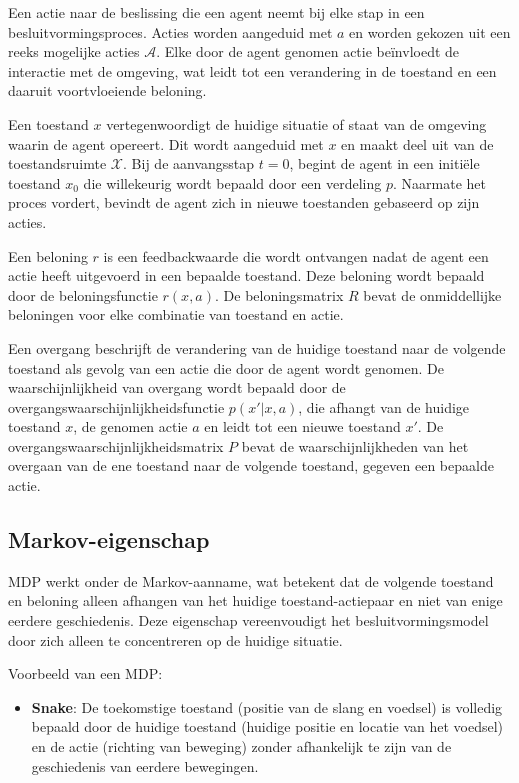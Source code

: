 \documentclass[a4paper,12pt]{report}
\begin{document}
Een actie naar de beslissing die een agent neemt bij elke stap in een
besluitvormingsproces. Acties worden aangeduid met \( a \) en worden gekozen
uit een reeks mogelijke acties \( \mathcal{A} \). Elke door de agent genomen
actie beïnvloedt de interactie met de omgeving, wat leidt tot een verandering
in de toestand en een daaruit voortvloeiende beloning.

Een toestand \( x \) vertegenwoordigt de huidige situatie of staat van de
omgeving waarin de agent opereert. Dit wordt aangeduid met \( x \) en maakt
deel uit van de toestandsruimte \( \mathcal{X} \). Bij de aanvangsstap \( t = 0
\), begint de agent in een initiële toestand \( x_0 \) die willekeurig wordt
bepaald door een verdeling \( p \). Naarmate het proces vordert, bevindt de
agent zich in nieuwe toestanden gebaseerd op zijn acties.

Een beloning \( r \) is een feedbackwaarde die wordt ontvangen nadat de agent
een actie heeft uitgevoerd in een bepaalde toestand. Deze beloning wordt
bepaald door de beloningsfunctie \( r(x, a) \). De beloningsmatrix \( R \)
bevat de onmiddellijke beloningen voor elke combinatie van toestand en actie.

Een overgang beschrijft de verandering van de huidige toestand naar de volgende
toestand als gevolg van een actie die door de agent wordt genomen. De
waarschijnlijkheid van overgang wordt bepaald door de
overgangswaarschijnlijkheidsfunctie \( p(x'|x, a) \), die afhangt van de
huidige toestand \( x \), de genomen actie \( a \) en leidt tot een nieuwe
toestand \( x' \). De overgangswaarschijnlijkheidsmatrix \( P \) bevat de
waarschijnlijkheden van het overgaan van de ene toestand naar de volgende
toestand, gegeven een bepaalde actie.

\subsection{Markov-eigenschap}

MDP werkt onder de Markov-aanname, wat betekent dat de volgende toestand en
beloning alleen afhangen van het huidige toestand-actiepaar en niet van enige
eerdere geschiedenis. Deze eigenschap vereenvoudigt het besluitvormingsmodel
door zich alleen te concentreren op de huidige situatie.

Voorbeeld van een MDP:
\begin{itemize}
    \item \textbf{Snake}: De toekomstige toestand (positie van de slang en voedsel) is volledig bepaald door de huidige toestand (huidige positie en locatie van het voedsel) en de actie (richting van beweging) zonder afhankelijk te zijn van de geschiedenis van eerdere bewegingen.
\end{itemize}
\end{document}
